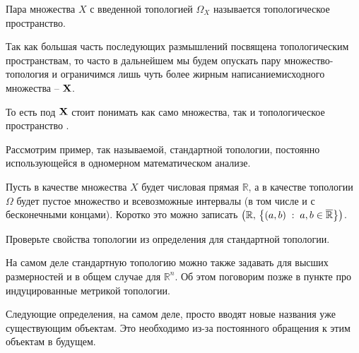 \begin{Def}
    Пара \topX множества $X$ с введенной топологией $\Omega_X$ называется топологическое пространство.
\end{Def}
\begin{Note}
    Так как большая часть последующих размышлений посвящена топологическим пространствам, то часто в дальнейшем мы будем опускать пару множество-топология и ограничимся лишь чуть более жирным написаниемисходного множества -- $\mathbf{X}$.

    То есть под $\mathbf{X}$ стоит понимать как само множества, так и топологическое пространство \topX.
\end{Note}

\begin{Ex}
    Рассмотрим пример, так называемой, стандартной топологии, постоянно использующейся в одномерном  математическом анализе.

    Пусть в качестве множества  $X$ будет числовая прямая $\mathbb{R}$, а в качестве топологии $\Omega$ будет пустое множество и всевозможные интервалы (в том числе и с бесконечными концами). Коротко это можно записать $\left( \mathbb{R}, \, \left\{ (a,b) \; : \; a,b \in \overline{\mathbb{R}} \right\} \right)$.
\end{Ex}
\begin{Task}
    Проверьте свойства топологии из определения для стандартной топологии.
\end{Task}

На самом деле стандартную топологию можно также задавать для высших размерностей и в общем случае для $\mathbb{R}^n$. Об этом поговорим позже в пункте про индуцированные метрикой топологии.

Следующие определения, на самом деле, просто вводят новые названия уже существующим объектам. Это необходимо из-за постоянного обращения к этим объектам в будущем.

